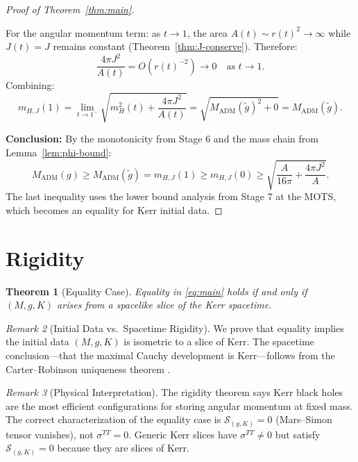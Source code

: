 \documentclass[12pt]{article}
\theoremstyle{plain}
\newtheorem{theorem}{Theorem}[section]
\theoremstyle{definition}
\theoremstyle{remark}
\newtheorem{remark}[theorem]{Remark}
\newcommand{\ADM}{\mathrm{ADM}}
\newcommand{\tg}{\tilde{g}}
\begin{document}
\begin{proof}[Proof of Theorem~\ref{thm:main}]
\begin{itemize}
    For the angular momentum term: as $t \to 1$, the area $A(t) \sim r(t)^2 \to \infty$ while $J(t) = J$ remains constant (Theorem~\ref{thm:J-conserve}). Therefore:
    \[
    \frac{4\pi J^2}{A(t)} = O(r(t)^{-2}) \to 0 \quad \text{as } t \to 1.
    \]
    Combining:
    \[
    m_{H,J}(1) = \lim_{t \to 1^-}\sqrt{m_H^2(t) + \frac{4\pi J^2}{A(t)}} = \sqrt{M_{\ADM}(\tg)^2 + 0} = M_{\ADM}(\tg).
    \]
\end{itemize}

\textbf{Conclusion:}
By the monotonicity from Stage 6 and the mass chain from Lemma~\ref{lem:phi-bound}:
\[
M_{\ADM}(g) \geq M_{\ADM}(\tg) = m_{H,J}(1) \geq m_{H,J}(0) \geq \sqrt{\frac{A}{16\pi} + \frac{4\pi J^2}{A}}.
\]
The last inequality uses the lower bound analysis from Stage 7 at the MOTS, which becomes an equality for Kerr initial data.
\end{proof}


\section{Rigidity}\label{sec:rigidity}

\begin{theorem}[Equality Case]\label{thm:rigidity}
Equality in \eqref{eq:main} holds if and only if $(M, g, K)$ arises from a spacelike slice of the Kerr spacetime.
\end{theorem}

\begin{remark}[Initial Data vs.\ Spacetime Rigidity]\label{rem:initial-data-rigidity}
We prove that equality implies the initial data $(M, g, K)$ is isometric to a slice of Kerr. The spacetime conclusion---that the maximal Cauchy development is Kerr---follows from the Carter--Robinson uniqueness theorem \cite{carter1971, robinson1975}.
\end{remark}

\begin{remark}[Physical Interpretation]\label{rem:rigidity-physics}
The rigidity theorem says Kerr black holes are the most efficient configurations for storing angular momentum at fixed mass. The correct characterization of the equality case is $\mathcal{S}_{(g,K)} = 0$ (Mars--Simon tensor vanishes), not $\sigma^{TT} = 0$. Generic Kerr slices have $\sigma^{TT} \neq 0$ but satisfy $\mathcal{S}_{(g,K)} = 0$ because they are slices of Kerr.
\end{remark}
\end{document}
